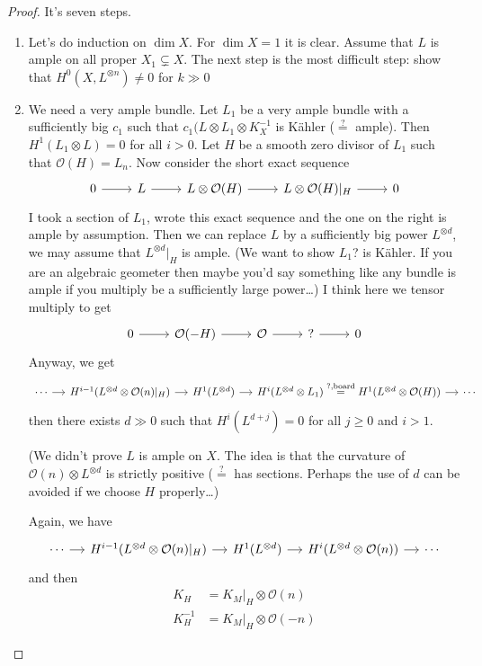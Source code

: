 \begin{proof}\leavevmode It's seven steps.
	\begin{enumerate}[label=\textbf{Step \arabic*}]
		\item Let's do induction on $\dim X$. For $\dim X=1$ it is clear. Assume that $L$ is ample on all proper $X_1\subsetneq X$. The next step is the {\color{3}most difficult step}: show that $H^{0}(X,L^{\otimes n})\neq 0$ for $k\gg 0$

		\item We need a very ample bundle. Let $L_1$ be a very ample bundle with a sufficiently big $c_1$ such that $c_1(L\otimes L_1\otimes K^{-1}_X$ is Kähler ($\overset{?}{=}$ ample). Then $H^{1}(L_1\otimes L)=0$ for all $i>0$. Let  $H$ be a smooth zero divisor of $L_1$ such that $\mathcal{O}(H)=L_n$. Now consider the short exact sequence
			\[\begin{tikzcd}
				0\arrow[r]&L\arrow[r]&L\otimes \mathcal{O}(H)\arrow[r]&L\otimes \mathcal{O}(H)|_{H}\arrow[r]&0
			\end{tikzcd}\]
			I took a section of $L_1$, wrote this exact sequence and the one on the right is ample by assumption. Then we can replace $L$ by a sufficiently big power $L^{\otimes d}$, we may assume that $L^{\otimes d}|_{H}$ is ample. (We want to show $L_1$? is Kähler. If you are an algebraic geometer then maybe you'd say something like any bundle is ample if you multiply be a sufficiently large power…) {\color{4}I think} here we tensor multiply to get
			\[\begin{tikzcd}
				0\arrow[r]&\mathcal{O}(-H)\arrow[r]&\mathcal{O}\arrow[r]&?\arrow[r]&0
			\end{tikzcd}\]
			Anyway, we get
			\[\begin{tikzcd}[column sep=small]
				\cdots\arrow[r]&H^{i-1}(L^{\otimes d}\otimes \mathcal{O}(n)|_{H})\arrow[r]&H^{1}(L^{\otimes d})\arrow[r]&H^{i}(L^{\otimes d}\otimes L_1)\overset{?, \text{board} }{=}H^{1}(L^{\otimes d}\otimes \mathcal{O}(H))\arrow[r]&\cdots
			\end{tikzcd}\]
			then there exists $d\gg 0$ such that  $H^{i}(L^{d+j})=0$ for all $j\geq 0$ and $i>1$.

			(We didn't prove  $L$ is ample on  $X$. The idea is that the curvature of $\mathcal{O}(n)\otimes L^{\otimes d}$ is strictly positive ($\overset{?}{=}$ has sections. Perhaps the use of $d$ can be avoided if we choose $H$ properly…)


			Again, we have 
			\[\begin{tikzcd}[column sep=small]
				\cdots\arrow[r]&H^{i-1}(L^{\otimes d}\otimes \mathcal{O}(n)|_{H})\arrow[r]&H^{1}(L^{\otimes d})\arrow[r]&H^{i}(L^{\otimes d}\otimes \mathcal{O}(n))\arrow[r]&\cdots
			\end{tikzcd}\]
and then
\begin{align*}
	K_H&=K_M|_{H}\otimes \mathcal{O}(n)\\
	K_H^{-1}&=K_M|_{H}\otimes \mathcal{O}(-n)
\end{align*}


\end{enumerate}
\end{proof}
